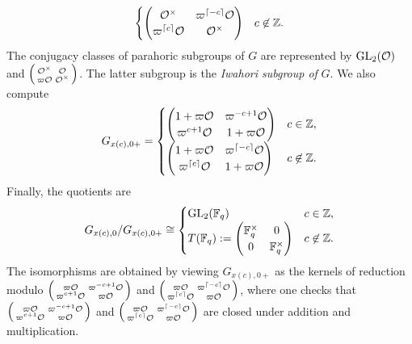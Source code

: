 \begin{example}
$$\begin{cases}
        \begin{pmatrix}
            \mathcal{O}^\times & \varpi^{\lceil -c\rceil}\mathcal{O} \\ \varpi^{\lceil c\rceil} \mathcal{O} & \mathcal{O}^\times
        \end{pmatrix}  & c \not\in \mathbb{Z}.
    \end{cases}
    $$
    The conjugacy classes of parahoric subgroups of $G$ are represented by $\mathrm{GL}_2(\mathcal{O})$ and $\begin{psmallmatrix}
        \mathcal{O}^\times & \mathcal{O} \\ \varpi\mathcal{O} & \mathcal{O}^\times
    \end{psmallmatrix}$. The latter subgroup is the \textit{Iwahori subgroup of} $G$. We also compute 
    $$
    G_{x(c),0+} = 
    \begin{cases}  
        \begin{pmatrix}
            1+\varpi\mathcal{O} & \varpi^{-c+1}\mathcal{O} \\ \varpi^{c+1} \mathcal{O} & 1+\varpi\mathcal{O}
        \end{pmatrix} & c \in \mathbb{Z}, \\
        \begin{pmatrix}
            1+\varpi\mathcal{O} & \varpi^{\lceil -c\rceil}\mathcal{O} \\ \varpi^{\lceil c\rceil} \mathcal{O} & 1+\varpi\mathcal{O}
        \end{pmatrix}  & c \not\in \mathbb{Z}.
    \end{cases}
    $$
    Finally, the quotients are 
    $$
    G_{x(c),0}/G_{x(c),0+} \cong 
    \begin{cases}  
        \mathrm{GL}_2(\mathbb{F}_q) & c \in \mathbb{Z}, \\
        T(\mathbb{F}_q) := \begin{pmatrix}
            \mathbb{F}_q^\times & 0 \\ 0 & \mathbb{F}_q^\times
        \end{pmatrix}  & c \not\in \mathbb{Z}.
    \end{cases}
    $$
    The isomorphisms are obtained by viewing $G_{x(c),0+}$ as the kernels of reduction modulo $\begin{psmallmatrix}
        \varpi\mathcal{O} & \varpi^{-c+1}\mathcal{O} \\ \varpi^{c+1}\mathcal{O} & \varpi \mathcal{O}
    \end{psmallmatrix}$ and $\begin{psmallmatrix}
        \varpi\mathcal{O} & \varpi^{\lceil -c\rceil}\mathcal{O} \\ \varpi^{\lceil c\rceil} \mathcal{O} & \varpi\mathcal{O}
    \end{psmallmatrix}$, where one checks that $\begin{psmallmatrix}
        \varpi\mathcal{O} & \varpi^{-c+1}\mathcal{O} \\ \varpi^{c+1}\mathcal{O} & \varpi \mathcal{O}
    \end{psmallmatrix}$ and $\begin{psmallmatrix}
        \varpi\mathcal{O} & \varpi^{\lceil -c\rceil}\mathcal{O} \\ \varpi^{\lceil c\rceil} \mathcal{O} & \varpi\mathcal{O}
    \end{psmallmatrix}$ are closed under addition and multiplication.   
\end{example}

